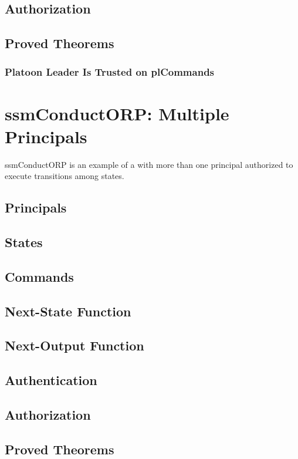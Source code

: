 \documentclass[../../main/main.tex]{subfiles}
\begin{document}
\subsection{Authorization}
\subsection{Proved Theorems}
\subsubsection{Platoon Leader Is Trusted on plCommands}


     
\section{ssmConductORP: Multiple Principals}
ssmConductORP is an example of a  with more than one principal authorized to execute transitions among states.

\subsection{Principals}
\subsection{States}
\subsection{Commands}
\subsection{Next-State Function}
\subsection{Next-Output Function}
\subsection{Authentication}
\HOLssmPlanPBTheoremsinputOKXXdef


\subsection{Authorization}
\subsection{Proved Theorems}
\end{document}
